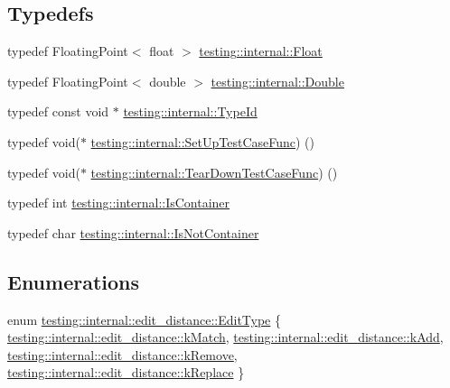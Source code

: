 \subsection*{Typedefs}
\begin{DoxyCompactItemize}
\item 
typedef Floating\+Point$<$ float $>$ \hyperlink{namespacetesting_1_1internal_a02e1981f5ff70609e6ac06e006ff519a}{testing\+::internal\+::\+Float}
\item 
typedef Floating\+Point$<$ double $>$ \hyperlink{namespacetesting_1_1internal_a66a7579b1893b260c31dad577f7a5c48}{testing\+::internal\+::\+Double}
\item 
typedef const void $\ast$ \hyperlink{namespacetesting_1_1internal_ab1114197d3c657d8b7f8e0c5caa12d00}{testing\+::internal\+::\+Type\+Id}
\item 
typedef void($\ast$ \hyperlink{namespacetesting_1_1internal_a30037044c0b57cdd647c7e2e97cb2cff}{testing\+::internal\+::\+Set\+Up\+Test\+Case\+Func}) ()
\item 
typedef void($\ast$ \hyperlink{namespacetesting_1_1internal_a085e31321d0d029c04d2a79234f60c1a}{testing\+::internal\+::\+Tear\+Down\+Test\+Case\+Func}) ()
\item 
typedef int \hyperlink{namespacetesting_1_1internal_ad8f0c2883245f1df2a53618a49f0deb3}{testing\+::internal\+::\+Is\+Container}
\item 
typedef char \hyperlink{namespacetesting_1_1internal_abf080521ce135deb510e0a7830fd3d33}{testing\+::internal\+::\+Is\+Not\+Container}
\end{DoxyCompactItemize}
\subsection*{Enumerations}
\begin{DoxyCompactItemize}
\item 
enum \hyperlink{namespacetesting_1_1internal_1_1edit__distance_ad46aa6da12aec1a3f166310478b53a08}{testing\+::internal\+::edit\+\_\+distance\+::\+Edit\+Type} \{ \hyperlink{namespacetesting_1_1internal_1_1edit__distance_ad46aa6da12aec1a3f166310478b53a08a7bdb9c74613a94f21b7489e0b5640a63}{testing\+::internal\+::edit\+\_\+distance\+::k\+Match}, 
\hyperlink{namespacetesting_1_1internal_1_1edit__distance_ad46aa6da12aec1a3f166310478b53a08a63400b073f5b311a87d568b5ae27ffe8}{testing\+::internal\+::edit\+\_\+distance\+::k\+Add}, 
\hyperlink{namespacetesting_1_1internal_1_1edit__distance_ad46aa6da12aec1a3f166310478b53a08a814768ef6cd0264a0a10b1e701a63e78}{testing\+::internal\+::edit\+\_\+distance\+::k\+Remove}, 
\hyperlink{namespacetesting_1_1internal_1_1edit__distance_ad46aa6da12aec1a3f166310478b53a08afdbf30ecf9f32f60c646a34a358615f2}{testing\+::internal\+::edit\+\_\+distance\+::k\+Replace}
 \}
\end{DoxyCompactItemize}
